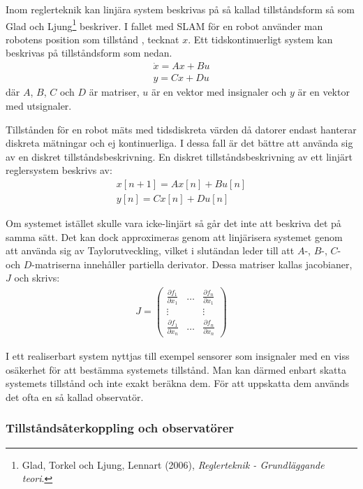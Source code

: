 \documentclass[a4paper,12pt,fleqn]{article}
\begin{document}
Inom reglerteknik kan linjära system beskrivas på så kallad tillståndsform så som Glad och Ljung\footnote{Glad, Torkel och Ljung, Lennart (2006), \textit{Reglerteknik - Grundläggande teori}.} beskriver. I fallet med SLAM för en robot använder man robotens position som tillstånd , tecknat $x$. Ett tidskontinuerligt system kan beskrivas på tillståndsform som nedan.
\begin{gather}
\dot{x}=Ax+Bu \\
y=Cx+Du	
\label{equ:tillstand}
\end{gather}
där $A$, $B$, $C$ och $D$ är matriser, $u$ är en vektor med insignaler och $y$ är en vektor med utsignaler.

Tillstånden för en robot mäts med tidsdiskreta värden då datorer endast hanterar diskreta mätningar och ej kontinuerliga. I dessa fall är det bättre att använda sig av en diskret tillståndsbeskrivning. En diskret tillståndsbeskrivning av ett linjärt reglersystem beskrivs av: 
\begin{gather}
x[n+1] = Ax[n] + Bu[n] \\
y[n] = Cx[n] + Du[n]
\end{gather}

Om systemet istället skulle vara icke-linjärt så går det inte att beskriva det på samma sätt. Det kan dock approximeras genom att linjärisera systemet genom att använda sig av Taylorutveckling, vilket i slutändan leder till att $A$-, $B$-, $C$- och $D$-matriserna innehåller partiella derivator. Dessa matriser kallas jacobianer, $J$ och skrivs:
\begin{gather}
	J= \begin{pmatrix}
	\frac{\partial f_1}{\partial x_1} & \dots & \frac{\partial f_n}{\partial x_1} \\
	  							\vdots &       & \vdots \\
	  \frac{\partial f_1}{\partial x_n} & \dots & \frac{\partial f_n}{\partial x_n}
	  \end{pmatrix}
\end{gather}



I ett realiserbart system nyttjas till exempel sensorer som insignaler med en viss osäkerhet för att bestämma systemets tillstånd. Man kan därmed enbart skatta systemets tillstånd och inte exakt beräkna dem. För att uppskatta dem används det ofta en så kallad observatör.

\subsubsection{Tillståndsåterkoppling och observatörer}
\end{document}

